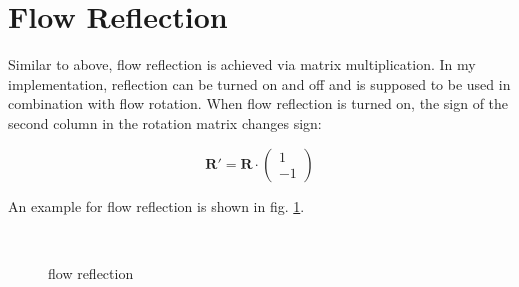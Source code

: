 \documentclass[a4paper,10pt,notitlepage]{scrreprt}
\newcommand{\mat}[1]{\mathbf{#1}}
\begin{document}
\section{Flow Reflection}

Similar to above, flow reflection is achieved via matrix multiplication. In my
implementation, reflection can be turned on and off and is supposed to be used
in combination with flow rotation. When flow reflection is turned on, the sign
of the second column in the rotation matrix changes sign:

\begin{equation}
 \mat{R}' = \mat{R} \cdot \left( \begin{array}{c} 1 \\ -1\end{array} \right)
\end{equation}

An example for flow reflection is shown in fig. \ref{fig:flow-reflection}.

\begin{figure}
  \centering
  \\
  \caption{flow reflection}
  \label{fig:flow-reflection}
\end{figure}
\end{document}
